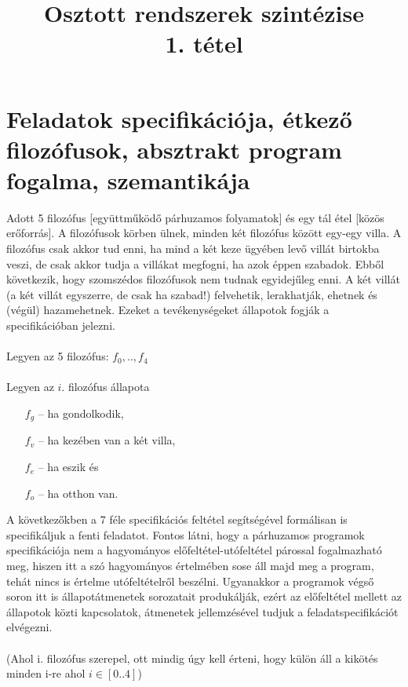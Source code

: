 \documentclass{article}
\title{Osztott rendszerek szintézise\\1. tétel}
\begin{document}
\section*{Feladatok specifikációja, étkező filozófusok, absztrakt program fogalma, szemantikája}
Adott 5 filozófus [együttműködő párhuzamos folyamatok] és egy tál étel [közös erőforrás]. A filozófusok körben ülnek, minden két filozófus között egy-egy villa. A filozófus csak akkor tud enni, ha mind a két keze ügyében levő villát birtokba veszi, de csak akkor tudja a villákat megfogni, ha azok éppen szabadok. Ebből következik, hogy szomszédos filozófusok nem tudnak egyidejűleg enni. A két villát (a két villát egyszerre, de csak ha szabad!) felvehetik, lerakhatják, ehetnek és (végül) hazamehetnek. Ezeket a tevékenységeket állapotok fogják a specifikációban jelezni.
\\\\
Legyen az 5 filozófus: $f_0,..,f_4$\\\\
Legyen az $i.$ filozófus állapota
\begin{multicols}{2}
\begin{enumerate}
\item[$f_g$]– ha gondolkodik,
\item[$f_v$]– ha kezében van a két villa,
\item[$f_e$]– ha eszik és
\item[$f_o$]– ha otthon van.
\end{enumerate}
\end{multicols}
A következőkben a 7 féle specifikációs feltétel segítségével formálisan is specifikáljuk a fenti feladatot. Fontos látni, hogy a párhuzamos programok specifikációja nem a hagyományos előfeltétel-utófeltétel párossal fogalmazható meg, hiszen itt a szó hagyományos értelmében sose áll majd meg a program, tehát nincs is értelme utófeltételről beszélni. Ugyanakkor a programok végső soron itt is állapotátmenetek sorozatait produkálják, ezért az előfeltétel mellett az állapotok közti kapcsolatok, átmenetek jellemzésével tudjuk a feladatspecifikációt elvégezni.
\\
\\
(Ahol i. filozófus szerepel, ott mindig úgy kell érteni, hogy külön áll a kikötés minden i-re ahol $i \in [0..4]$)
\\\\
\end{document}
